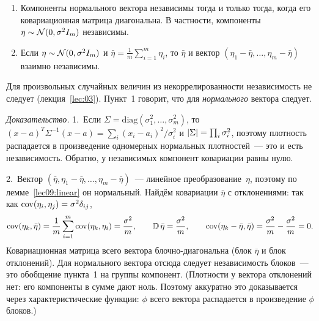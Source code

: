 \begin{lemma}
  \label{lec09:spherical}
  \leavevmode
  \begin{enumerate}
    \item Компоненты нормального вектора независимы тогда и только тогда, когда его
          ковариационная матрица диагональна. В частности, компоненты
          $\eta \sim \mathcal{N}(0, \sigma^2 I_m)$ независимы.
    \item {\upshape\cite[гл.~16, лемма~2.2]{bure}} Если $\eta \sim \mathcal{N}(0, \sigma^2 I_m)$ и
          $\bar\eta = \frac1m \sum_{i=1}^m \eta_i$, то $\bar\eta$ и вектор
          $(\eta_1 - \bar\eta, \ldots, \eta_m - \bar\eta)$ взаимно независимы.
  \end{enumerate}
\end{lemma}

\begin{remark}
  Для произвольных случайных величин из некоррелированности независимость не следует
  (лекция~\ref{lec:03}). Пункт~1 говорит, что для \emph{нормального} вектора следует.
\end{remark}

\begin{addendum}
  \emph{Доказательство.} 1.~Если $\Sigma = \mathrm{diag}(\sigma_1^2, \ldots, \sigma_m^2)$, то
  $(x - a)^T \Sigma^{-1} (x - a) = \sum_i (x_i - a_i)^2 / \sigma_i^2$ и
  $\lvert \Sigma \rvert = \prod_i \sigma_i^2$, поэтому плотность распадается в произведение
  одномерных нормальных плотностей~--- это и есть независимость. Обратно, у независимых
  компонент ковариации равны нулю.

  2.~Вектор $(\bar\eta, \eta_1 - \bar\eta, \ldots, \eta_m - \bar\eta)$~--- линейное
  преобразование~$\eta$, поэтому по лемме~\ref{lec09:linear} он нормальный. Найдём
  ковариации $\bar\eta$ с отклонениями: так как $\operatorname{cov}(\eta_i, \eta_j) = \sigma^2 \delta_{ij}$,
  \[
    \operatorname{cov}(\eta_k, \bar\eta) = \frac1m \sum_{i=1}^m \operatorname{cov}(\eta_k, \eta_i) = \frac{\sigma^2}{m},
    \qquad
    \operatorname{\mathbb{D}}\bar\eta = \frac{\sigma^2}{m},
    \qquad
    \operatorname{cov}(\eta_k - \bar\eta, \bar\eta) = \frac{\sigma^2}{m} - \frac{\sigma^2}{m} = 0.
  \]
  Ковариационная матрица всего вектора блочно-диагональна (блок $\bar\eta$ и блок
  отклонений). Для нормального вектора отсюда следует независимость блоков~--- это
  обобщение пункта~1 на группы компонент. (Плотности у вектора отклонений нет: его
  компоненты в сумме дают ноль. Поэтому аккуратно это доказывается через характеристические
  функции: $\phi$ всего вектора распадается в произведение $\phi$ блоков.)
\end{addendum}

